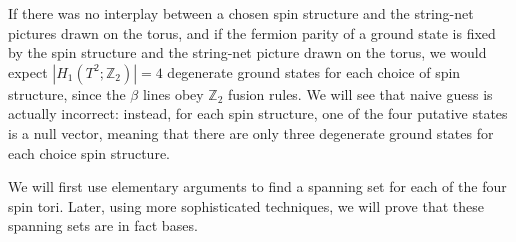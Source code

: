 \documentclass[12pt,a4paper]{article}
\newcommand{\cc}{\mathbb{C}}
\newcommand{\mct}{\mathcal{T}}
\newcommand{\zt}{\mathbb{Z}_2}
\newcommand\be            {\begin{equation}}
\newcommand\ee            {\end{equation}}
\newcommand{\End}{\text{End}}
\newcommand{\tube}{\textbf{Tube}}
\newcommand{\kwsep}{\bigskip\hrule\medskip\hrule\medskip\hrule\bigskip}
\begin{document}

If there was no interplay between a chosen spin structure and the string-net pictures drawn on the torus, 
and if the fermion parity of a ground state is fixed by the spin structure 
and the string-net picture drawn on the torus, we would expect $|H_1(T^2;\zt)|=4$ 
degenerate ground states 
for each choice of spin structure, since the $\beta$ lines obey $\zt$ fusion rules. 
We will see that naive guess is actually incorrect: instead, for each spin structure, 
one of the four putative states is a null vector, meaning that there are only three degenerate 
ground states for each choice spin structure.

We will first use elementary arguments to find a spanning set for each of the four spin tori.
Later, using more sophisticated techniques, we will prove that these spanning sets are in fact bases.
\end{document}
